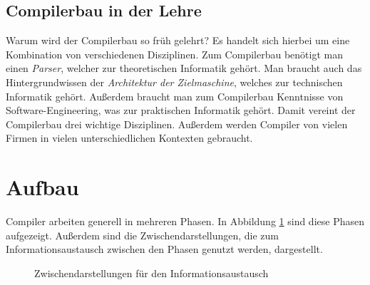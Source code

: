 \documentclass[ngerman,abstract=true]{scrartcl}
\begin{document}
\subsection{Compilerbau in der Lehre}

Warum wird der Compilerbau so früh gelehrt? Es handelt sich hierbei um eine Kombination von verschiedenen Disziplinen. Zum Compilerbau benötigt man einen \emph{Parser}, welcher zur theoretischen Informatik gehört. Man braucht auch das Hintergrundwissen der \emph{Architektur der Zielmaschine}, welches zur technischen Informatik gehört. Außerdem braucht man zum Compilerbau Kenntnisse von Software-Engineering, was zur praktischen Informatik gehört. Damit vereint der Compilerbau drei wichtige Disziplinen. Außerdem werden Compiler von vielen Firmen in vielen unterschiedlichen Kontexten gebraucht. 

\section{Aufbau}

Compiler arbeiten generell in mehreren Phasen. In Abbildung \ref{fig:compilerstages} sind diese Phasen aufgezeigt. Außerdem sind die  Zwischendarstellungen, die zum Informationsaustausch zwischen den Phasen genutzt werden, dargestellt.

\begin{figure}\centering
{}
\caption{Zwischendarstellungen für den Informationsaustausch}\label{fig:compilerstages}
\end{figure}
\end{document}
